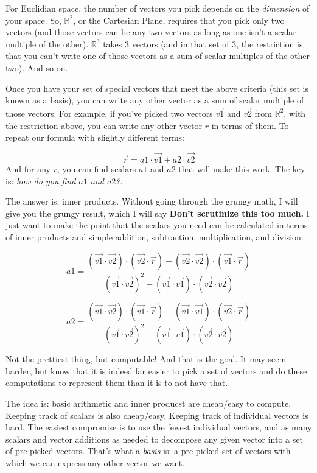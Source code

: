 \documentclass[
]{book}
\begin{document}
For Euclidian space, the number of vectors you pick depends on the \emph{dimension} of your space. So, \(\mathbb{R}^2\), or the Cartesian Plane, requires that you pick only two vectors (and those vectors can be any two vectors as long as one isn't a scalar multiple of the other). \(\mathbb{R}^3\) takes 3 vectors (and in that set of 3, the restriction is that you can't write one of those vectors as a sum of scalar multiples of the other two). And so on.

Once you have your set of special vectors that meet the above criteria (this set is known as a basis), you can write any other vector as a sum of scalar multiple of those vectors. For example, if you've picked two vectors \(\vec{v1}\) and \(\vec{v2}\) from \(\mathbb{R}^2\), with the restriction above, you can write any other vector \(r\) in terms of them. To repeat our formula with slightly different terms:

\[\vec{r} = a1\cdot\vec{v1} + a2\cdot\vec{v2}\]
And for any \(r\), you can find scalars \(a1\) and \(a2\) that will make this work. The key is: \emph{how do you find \(a1\) and \(a2\)?}.

The answer is: inner products. Without going through the grungy math, I will give you the grungy result, which I will say \textbf{Don't scrutinize this too much.} I just want to make the point that the scalars you need can be calculated in terms of inner products and simple addition, subtraction, multiplication, and division.

\[a1 = \frac{(\vec{v1}\cdot\vec{v2})\cdot(\vec{v2}\cdot\vec{r})-(\vec{v2}\cdot\vec{v2})\cdot(\vec{v1}\cdot\vec{r})}{(\vec{v1}\cdot\vec{v2})^2 - (\vec{v1}\cdot\vec{v1})\cdot(\vec{v2}\cdot\vec{v2})}\]

\[a2 = \frac{(\vec{v1}\cdot\vec{v2})\cdot(\vec{v1}\cdot\vec{r})-(\vec{v1}\cdot\vec{v1})\cdot(\vec{v2}\cdot\vec{r})}{(\vec{v1}\cdot\vec{v2})^2 - (\vec{v1}\cdot\vec{v1})\cdot(\vec{v2}\cdot\vec{v2})}\]

Not the prettiest thing, but computable! And that is the goal. It may seem harder, but know that it is indeed far easier to pick a set of vectors and do these computations to represent them than it is to not have that.

The idea is: basic arithmetic and inner producst are cheap/easy to compute. Keeping track of scalars is also cheap/easy. Keeping track of individual vectors is hard. The easiest compromise is to use the fewest individual vectors, and as many scalars and vector additions as needed to decompose any given vector into a set of pre-picked vectors. That's what a \emph{basis} is: a pre-picked set of vectors with which we can express any other vector we want.
\end{document}
